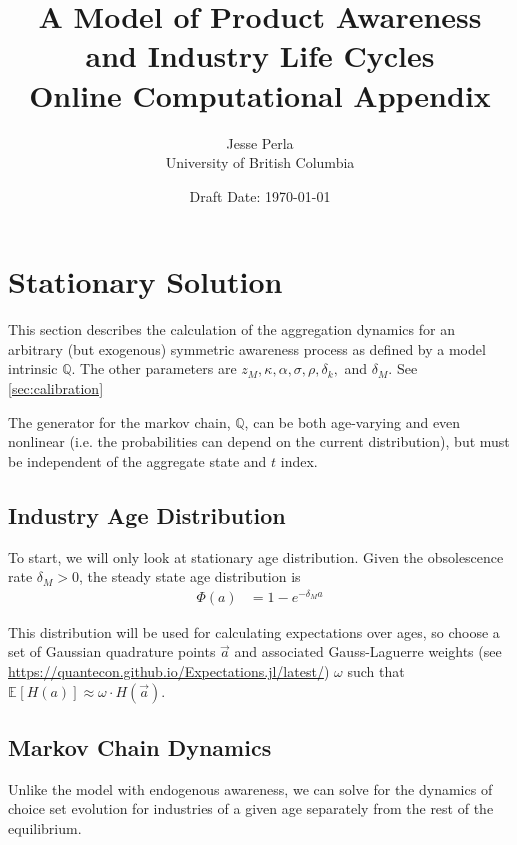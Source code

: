 \documentclass[12pt]{article}
\newcommand{\Q}[0]{\ensuremath{\mathbb{Q}}}
\newcommand{\expec}[2][]{\ensuremath{\mathbb{E}_{{#1}}\left[ {#2} \right]}}
\begin{document}
\title{\Large A Model of Product Awareness and Industry Life Cycles\\
Online Computational  Appendix
}
\author{Jesse Perla \\ University of British Columbia}
\date{Draft Date: \today}
\maketitle
\appendix
{}
\section{Stationary Solution}\label{sec:stationary-exogenous}
This section describes the calculation of the aggregation dynamics for an arbitrary (but exogenous) symmetric awareness process as defined by a model intrinsic $\Q$.  The other parameters are $z_M, \kappa, \alpha, \sigma, \rho, \delta_k,$ and $\delta_M$.  See \cref{sec:calibration}

The generator for the markov chain, $\Q$, can be both age-varying and even nonlinear (i.e. the probabilities can depend on the current distribution), but must be independent of the aggregate state and $t$ index.

\subsection{Industry Age Distribution}
To start, we will only look at stationary age distribution.  Given the obsolescence rate $\delta_M > 0$, the steady state age distribution is 
\begin{align}
\Phi(a) &= 1 - e^{-\delta_M a}
\end{align}

This distribution will be used for calculating expectations over ages, so choose a set of Gaussian quadrature points $\vec{a}$ and associated Gauss-Laguerre weights (see \url{https://quantecon.github.io/Expectations.jl/latest/}) $\omega$ such that $\expec{H(a)} \approx \omega \cdot H(\vec{a})$.

\subsection{Markov Chain Dynamics}
Unlike the model with endogenous awareness, we can solve for the dynamics of choice set evolution for industries of a given age separately from the rest of the equilibrium.
\end{document}
